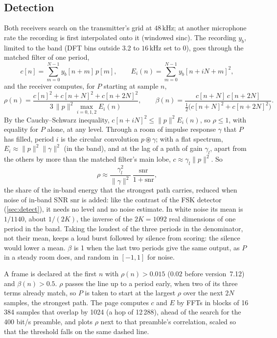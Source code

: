 \documentclass[11pt,a4paper]{article}
\newcommand{\kHz}{\,\mathrm{kHz}}
\theoremstyle{remark}
\begin{document}
\subsection{Detection}
\label{sec:c6det}
Both receivers search on the transmitter's grid at $48\kHz$; at another microphone rate the recording is first interpolated onto it (windowed sinc). The recording $y_b$, limited to the band (DFT bins outside 3.2 to $16\kHz$ set to 0), goes through the matched filter of one period,
\begin{equation}
c[n] = \sum_{m=0}^{N-1} y_b[n + m]\, p[m], \qquad E_i(n) = \sum_{m=0}^{N-1} y_b[n + iN + m]^2,
\end{equation}
and the receiver computes, for $P$ starting at sample $n$,
\begin{equation}
\rho(n) = \frac{c[n]^2 + c[n + N]^2 + c[n + 2N]^2}{3\, \|p\|^2 \max_{i = 0, 1, 2} E_i(n)}, \qquad
\beta(n) = \frac{c[n + N]\, c[n + 2N]}{\tfrac12\bigl(c[n + N]^2 + c[n + 2N]^2\bigr)}.
\label{eq:c6rho}
\end{equation}
By the Cauchy--Schwarz inequality, $c[n + iN]^2 \le \|p\|^2 E_i(n)$, so $\rho \le 1$, with equality for $P$ alone, at any level. Through a room of impulse response $\gamma$ that $P$ has filled, period $i$ is the circular convolution $p \circledast \gamma$; with a flat spectrum, $E_i \approx \|p\|^2 \|\gamma\|^2$ (in the band), and at the lag of a path of gain $\gamma_l$, apart from the others by more than the matched filter's main lobe, $c \approx \gamma_l \|p\|^2$. So
\begin{equation}
\rho \approx \frac{\gamma_l^2}{\|\gamma\|^2}\, \frac{\mathrm{snr}}{1 + \mathrm{snr}},
\end{equation}
the share of the in-band energy that the strongest path carries, reduced when noise of in-band SNR $\mathrm{snr}$ is added: like the contrast of the FSK detector (\cref{sec:detect}), it needs no level and no noise estimate. In white noise its mean is $1/1140$, about $1/(2K)$, the inverse of the $2K = 1092$ real dimensions of one period in the band. Taking the loudest of the three periods in the denominator, not their mean, keeps a loud burst followed by silence from scoring: the silence would lower a mean. $\beta$ is 1 when the last two periods give the same output, as $P$ in a steady room does, and random in $[-1, 1]$ for noise.

A frame is declared at the first $n$ with $\rho(n) > 0.015$ ($0.02$ before version~7.12) and $\beta(n) > 0.5$. $\rho$ passes the line up to a period early, when two of its three terms already match, so $P$ is taken to start at the largest $\rho$ over the next $2N$ samples, the strongest path. The page computes $c$ and $E$ by FFTs in blocks of 16\,384 samples that overlap by 1024 (a hop of 12\,288), ahead of the search for the 400 bit/s preamble, and plots $\rho$ next to that preamble's correlation, scaled so that the threshold falls on the same dashed line.
\end{document}
